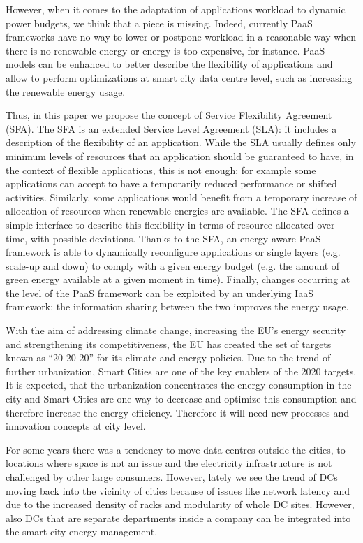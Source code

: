 However, when it comes to the adaptation of applications workload to dynamic power budgets, we think that a piece is missing.
Indeed, currently PaaS frameworks have no way to lower or postpone workload in a reasonable way when there is no renewable energy or energy is too expensive, for instance.
PaaS models can be enhanced to better describe the flexibility of applications and allow to perform optimizations at smart city data centre level, such as increasing the renewable energy usage.

Thus, in this paper we propose the concept of Service Flexibility Agreement (SFA). 
The SFA is an extended Service Level Agreement (SLA): it includes a description of the flexibility of an application.
While the SLA usually defines only minimum levels of resources that an application should be guaranteed to have, in the context of flexible applications, this is not enough: for example some applications can accept to have a temporarily reduced performance or shifted activities.
Similarly, some applications would benefit from a temporary increase of allocation of resources when renewable energies are available.
The SFA defines a simple interface to describe this flexibility in terms of resource allocated over time, with possible deviations. 
Thanks to the SFA, an energy-aware PaaS framework is able to dynamically reconfigure applications or single layers (e.g. scale-up and down) to comply with a given energy budget (e.g. the amount of green energy available at a given moment in time).
Finally, changes occurring at the level of the PaaS framework can be exploited by an underlying IaaS framework: the information sharing between the two improves the energy usage.

With the aim of addressing climate change, increasing the EU’s energy security and strengthening its competitiveness, the EU has created the set of targets known as “20-20-20” for its climate and energy policies. Due to the trend of further urbanization, Smart Cities are one of the key enablers of the 2020 targets. It is expected, that the urbanization concentrates the energy consumption in the city and Smart Cities are one way to decrease and optimize this consumption and therefore increase the energy efficiency. Therefore it will need new processes and innovation concepts at city level.

For some years there was a tendency to move data centres outside the cities, to locations where space is not an issue and the electricity infrastructure is not challenged by other large consumers. However, lately we see the trend of DCs moving back into the vicinity of cities because of issues like network latency and due to the increased density of racks and modularity of whole DC sites. However, also DCs that are separate departments inside a company can be integrated into the smart city energy management.

